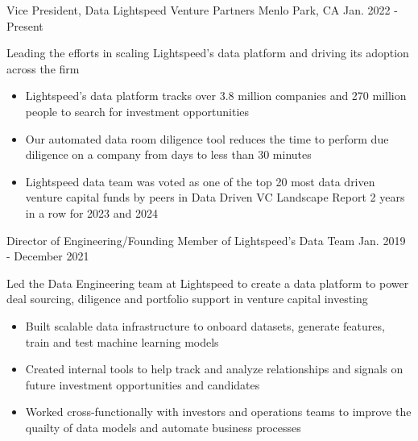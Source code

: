 

\begin{cventries}

  \cventry
  {Vice President, Data} %
  {Lightspeed Venture Partners} %
  {Menlo Park, CA} %
  {Jan. 2022 - Present} %
  {
    \begin{cvitems} %
      \item{Leading the efforts in scaling Lightspeed's data platform and driving its adoption across the firm}
      \begin{itemize}[label=$\circ$]
        \item{Lightspeed's data platform tracks over 3.8 million companies and 270 million people to search for investment opportunities}
        \item{Our automated data room diligence tool reduces the time to perform due diligence on a company from days to less than 30 minutes}
        \item{Lightspeed data team was voted as one of the top 20 most data driven venture capital funds by peers in Data Driven VC Landscape Report 2 years in a row for 2023 and 2024}
      \end{itemize}
    \end{cvitems}
  }

  \cventry
  {Director of Engineering/Founding Member of Lightspeed's Data Team} %
  {} %
  {} %
  {Jan. 2019 - December 2021} %
  {
    \begin{cvitems} %
      \item{Led the Data Engineering team at Lightspeed to create a data platform to power deal sourcing, diligence and portfolio support in venture capital investing}
      \begin{itemize}[label=$\circ$]
        \item{Built scalable data infrastructure to onboard datasets, generate features, train and test machine learning models}
        \item{Created internal tools to help track and analyze relationships and signals on future investment opportunities and candidates}
        \item{Worked cross-functionally with investors and operations teams to improve the quailty of data models and automate business processes}
      \end{itemize}
    \end{cvitems}
  }


\end{cventries}
